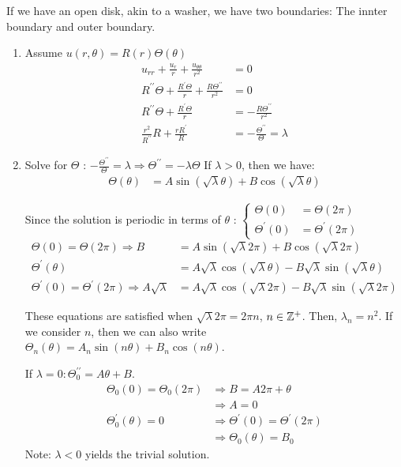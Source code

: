 If we have an open disk, akin to a washer, we have two boundaries: The innter boundary and outer boundary.
%
\begin{enumerate}
  \item Assume $u(r, \theta) = R(r) \Theta(\theta)$
  \begin{align}
    u_{rr} + \frac{u_r}{r} + \frac{u_{\theta\theta}}{r^2} & = 0\\
    R^{\prime\prime}\Theta + \frac{R^\prime \Theta}{r} + \frac{R\Theta^{\prime\prime}}{r^2} & = 0\\
    R^{\prime\prime} \Theta + \frac{R^\prime \Theta}{r} & = - \frac{R \Theta^{\prime\prime}}{r^2}\\
    \frac{r^2}{R^{\prime\prime}}{R} + \frac{r R^\prime}{R} & = - \frac{\Theta^{\prime\prime}}{\Theta} = \lambda
  \end{align}

  \item Solve for $\Theta$ : $-\frac{\Theta^{\prime\prime}}{\Theta} = \lambda \Rightarrow \Theta^{\prime\prime} = -\lambda \Theta$
  If $\lambda > 0$, then we have:
  \begin{align}
    \Theta(\theta) & = A \sin(\sqrt \lambda \theta) + B \cos(\sqrt \lambda \theta)
  \end{align}

  Since the solution is periodic in terms of $\theta$ :
  $\displaystyle
  \begin{cases}
    \Theta(0) & = \Theta(2 \pi)\\
    \Theta^\prime(0) & = \Theta^\prime(2 \pi)
  \end{cases}$
  \begin{align}
    \Theta(0) = \Theta(2 \pi) \Rightarrow B & = A \sin(\sqrt \lambda 2 \pi) + B \cos ( \sqrt \lambda 2 \pi)\\
    \Theta^\prime(\theta) & = A \sqrt \lambda \cos(\sqrt \lambda \theta) - B \sqrt \lambda \sin( \sqrt \lambda \theta)\\
    \Theta^\prime(0) = \Theta^\prime(2 \pi) \Rightarrow A \sqrt \lambda & = A \sqrt \lambda \cos(\sqrt \lambda 2 \pi) - B \sqrt \lambda \sin(\sqrt \lambda 2 \pi)
  \end{align}

  These equations are satisfied when $\sqrt \lambda 2 \pi = 2 \pi n$, $n \in \mathbb Z^+$. Then, $\lambda_n = n^2$. If we consider $n$, then we can also write $\Theta_n(\theta) = A_n \sin(n \theta) + B_n \cos(n \theta)$.

  If $\lambda = 0 : \Theta^{\prime\prime}_0 = A \theta + B$.
  \begin{align}
    \Theta_0(0) = \Theta_0(2 \pi) & \Rightarrow B = A 2\pi + \theta\\
    & \Rightarrow A = 0\\
    \Theta^\prime_0 (\theta) = 0 & \Rightarrow \Theta^\prime(0) = \Theta^\prime(2 \pi)\\
    & \Rightarrow \Theta_0(\theta) = B_0
  \end{align}
  Note: $\lambda < 0$ yields the trivial solution.


\end{enumerate}

